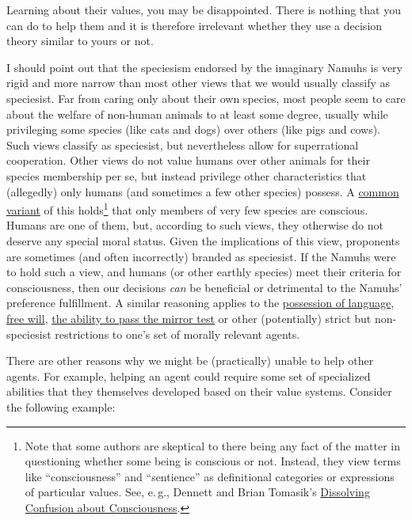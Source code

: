 Learning about their values, you may be disappointed. There is nothing
that you can do to help them and it is therefore irrelevant whether they
use a decision theory similar to yours or not.

I should point out that the speciesism endorsed by the imaginary Namuhs
is very rigid and more narrow than most other views that we would
usually classify as speciesist. Far from caring only about their own
species, most people seem to care about the welfare of non-human animals
to at least some degree, usually while privileging some species (like
cats and dogs) over others (like pigs and cows). Such views classify as
speciesist, but nevertheless allow for superrational cooperation. Other
views do not value humans over other animals for their species
membership per se, but instead privilege other characteristics that
(allegedly) only humans (and sometimes a few other species) possess. A
\href{https://en.wikipedia.org/wiki/Animal_consciousness\#Philosophical_background}{common
variant} of this holds\footnote{Note that some authors are skeptical to
  there being any fact of the matter in questioning whether some being
  is conscious or not. Instead, they view terms like ``consciousness''
  and ``sentience'' as definitional categories or expressions of
  particular values. See, e.\,g., Dennett \citeyear{Dennett1991-es}
  and Brian Tomasik's
  \href{http://reducing-suffering.org/dissolving-confusion-about-consciousness/}{Dissolving
  Confusion about Consciousness}.} that only members of very few
species are conscious. Humans are one of them, but, according to such
views, they otherwise do not deserve any special moral status. Given the
implications of this view, proponents are sometimes (and often
incorrectly) branded as speciesist. If the Namuhs were to hold such a
view, and humans (or other earthly species) meet their criteria for
consciousness, then our decisions \emph{can} be beneficial or
detrimental to the Namuhs' preference fulfillment. A similar reasoning
applies to the
\href{https://en.wikipedia.org/wiki/Animal_consciousness\#Language}{possession
of language}, \href{https://en.wikipedia.org/wiki/Free_will}{free
will},
\href{https://en.wikipedia.org/wiki/Animal_consciousness\#Mirror_test}{the
ability to pass the mirror test} or other (potentially) strict but
non-speciesist restrictions to one's set of morally relevant agents.

There are other reasons why we might be (practically) unable to help
other agents. For example, helping an agent could require some set of
specialized abilities that they themselves developed based on their
value systems. Consider the following example:


